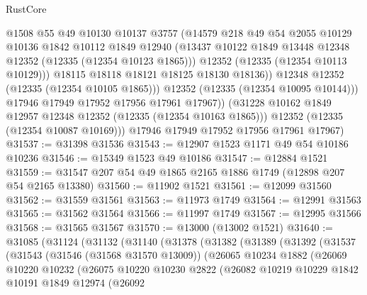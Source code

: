 \begin{lexlean}{RustCore}
\begin{coremodule}
                    @1508
                    @55
                    @49
                    @10130
                    @10137
                    @3757
                    (@14579
                      @218
                      @49
                      @54
                      @2055
                      @10129
                      @10136
                      @1842
                      @10112
                      @1849
                      @12940
                      (@13437 @10122 @1849 @13448 @12348 @12352 (@12335 (@12354 @10123 @1865)))
                      @12352
                      (@12335 (@12354 @10113 @10129)))
                    @18115
                    @18118
                    @18121
                    @18125
                    @18130
                    @18136))
                @12348
                @12352
                (@12335 (@12354 @10105 @1865)))
              @12352
              (@12335 (@12354 @10095 @10144)))
            @17946
            @17949
            @17952
            @17956
            @17961
            @17967))
        (@31228 @10162 @1849 @12957 @12348 @12352 (@12335 (@12354 @10163 @1865)))
        @12352
        (@12335 (@12354 @10087 @10169)))
      @17946
      @17949
      @17952
      @17956
      @17961
      @17967)
@31537 := @31398 @31536
@31543 := @12907 @1523 @1171 @49 @54 @10186 @10236
@31546 := @15349 @1523 @49 @10186
@31547 := @12884 @1521
@31559 := @31547 @207 @54 @49 @1865 @2165 @1886 @1749 (@12898 @207 @54 @2165 @13380)
@31560 := @11902 @1521
@31561 := @12099 @31560
@31562 := @31559 @31561
@31563 := @11973 @1749
@31564 := @12991 @31563
@31565 := @31562 @31564
@31566 := @11997 @1749
@31567 := @12995 @31566
@31568 := @31565 @31567
@31570 := @13000 (@13002 @1521)
@31640 := @31085
    (@31124
      (@31132
        (@31140
          (@31378
            (@31382
              (@31389
                (@31392
                  (@31537
                    (@31543
                      (@31546 (@31568 @31570 @13009))
                      (@26065
                        @10234
                        @1882
                        (@26069
                          @10220
                          @10232
                          (@26075
                            @10220
                            @10230
                            @2822
                            (@26082
                              @10219
                              @10229
                              @1842
                              @10191
                              @1849
                              @12974
                              (@26092

\end{coremodule}
\end{lexlean}
